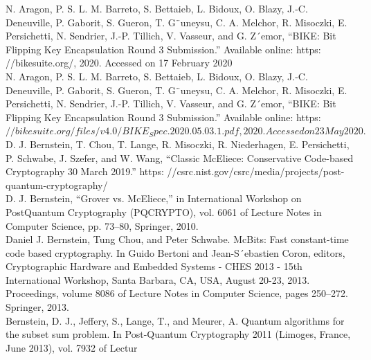\documentclass[12pt,openany]{report}
\begin{document}
\begin{thebibliography}{1}


\baselineskip=10pt



  N. Aragon, P. S. L. M. Barreto, S. Bettaieb, L. Bidoux, O. Blazy, J.-C.
Deneuville, P. Gaborit, S. Gueron, T. G¨uneysu, C. A. Melchor, R. Misoczki,
E. Persichetti, N. Sendrier, J.-P. Tillich, V. Vasseur, and G. Z´emor, “BIKE:
Bit Flipping Key Encapsulation Round 3 Submission.” Available online: https:
//bikesuite.org/, 2020. Accessed on 17 February 2020\\


  N. Aragon, P. S. L. M. Barreto, S. Bettaieb, L. Bidoux, O. Blazy, J.-C.
Deneuville, P. Gaborit, S. Gueron, T. G¨uneysu, C. A. Melchor, R. Misoczki,
E. Persichetti, N. Sendrier, J.-P. Tillich, V. Vasseur, and G. Z´emor, “BIKE:
Bit Flipping Key Encapsulation Round 3 Submission.” Available online: https:$
//bikesuite.org/files/v4.0/BIKE_Spec.2020.05.03.1.pdf, 2020. Accessed
on 23 May 2020.$\\





 D. J. Bernstein, T. Chou, T. Lange, R. Misoczki, R. Niederhagen, E. Persichetti, P. Schwabe, J. Szefer, and W. Wang, “Classic
McEliece: Conservative Code-based Cryptography 30 March 2019.” https:
//csrc.nist.gov/csrc/media/projects/post-quantum-cryptography/\\


 D. J. Bernstein, “Grover vs. McEliece,” in International Workshop on PostQuantum Cryptography (PQCRYPTO), vol. 6061 of Lecture Notes in Computer Science, pp. 73–80, Springer, 2010. \\


 Daniel J. Bernstein, Tung Chou, and Peter Schwabe. McBits: Fast constant-time code based cryptography. In Guido Bertoni and Jean-S´ebastien Coron, editors, Cryptographic
Hardware and Embedded Systems - CHES 2013 - 15th International Workshop, Santa
Barbara, CA, USA, August 20-23, 2013. Proceedings, volume 8086 of Lecture Notes in
Computer Science, pages 250–272. Springer, 2013.\\

 Bernstein, D. J., Jeffery, S., Lange, T., and Meurer, A. Quantum algorithms for the subset sum problem. In Post-Quantum Cryptography 2011 (Limoges, France, June 2013), vol. 7932 of Lectur\\


\end{thebibliography}
\end{document}
